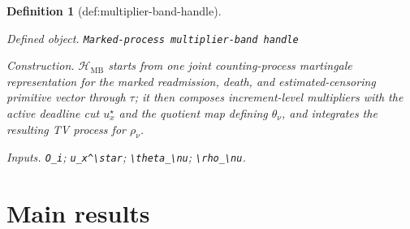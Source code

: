 \documentclass{article}
\newtheorem{definition}{Definition}
\begin{document}
\begin{definition}[def:multiplier-band-handle]\label{def:multiplier-band-handle}
\par\smallskip\noindent\emph{Defined object.} \texttt{Marked-\allowbreak{}process multiplier-\allowbreak{}band handle}
\par\smallskip\noindent\emph{Construction.} \(\mathscr H_{\mathrm{MB}}\) starts from one joint counting-process martingale representation for the marked readmission, death, and estimated-censoring primitive vector through \(\tau\); it then composes increment-level multipliers with the active deadline cut \(u_x^\star\) and the quotient map defining \(\theta_\nu\), and integrates the resulting TV process for \(\rho_\nu\).
\par\smallskip\noindent\emph{Inputs.} \texttt{O\_\allowbreak{}i}; \texttt{u\_\allowbreak{}x\textasciicircum{}\textbackslash{}\allowbreak{}star}; \texttt{\textbackslash{}\allowbreak{}theta\_\allowbreak{}\textbackslash{}\allowbreak{}nu}; \texttt{\textbackslash{}\allowbreak{}rho\_\allowbreak{}\textbackslash{}\allowbreak{}nu}.
\end{definition}

\section{Main results}
\end{document}
